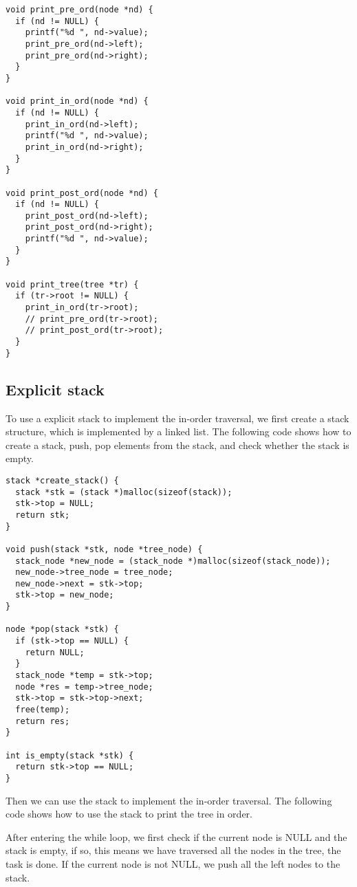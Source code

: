 \documentclass[a4paper,11pt]{article}
\begin{document}
\begin{verbatim}
void print_pre_ord(node *nd) {
  if (nd != NULL) {
    printf("%d ", nd->value);
    print_pre_ord(nd->left);
    print_pre_ord(nd->right);
  }
}

void print_in_ord(node *nd) {
  if (nd != NULL) {
    print_in_ord(nd->left);
    printf("%d ", nd->value);
    print_in_ord(nd->right);
  }
}

void print_post_ord(node *nd) {
  if (nd != NULL) {
    print_post_ord(nd->left);
    print_post_ord(nd->right);
    printf("%d ", nd->value);
  }
}

void print_tree(tree *tr) {
  if (tr->root != NULL) {
    print_in_ord(tr->root);
    // print_pre_ord(tr->root);
    // print_post_ord(tr->root);
  }
}
\end{verbatim}

\subsection*{Explicit stack}

To use a explicit stack to implement the in-order traversal, we first 
create a stack structure, which is implemented by a linked list. The following
code shows how to create a stack, push, pop elements from the stack, and check
whether the stack is empty.

\begin{verbatim}
stack *create_stack() {
  stack *stk = (stack *)malloc(sizeof(stack));
  stk->top = NULL;
  return stk;
}

void push(stack *stk, node *tree_node) {
  stack_node *new_node = (stack_node *)malloc(sizeof(stack_node));
  new_node->tree_node = tree_node;
  new_node->next = stk->top;
  stk->top = new_node;
}

node *pop(stack *stk) {
  if (stk->top == NULL) {
    return NULL;
  }
  stack_node *temp = stk->top;
  node *res = temp->tree_node;
  stk->top = stk->top->next;
  free(temp);
  return res;
}

int is_empty(stack *stk) {
  return stk->top == NULL;
}
\end{verbatim}

Then we can use the stack to implement the in-order traversal. The following
code shows how to use the stack to print the tree in order. 

After entering the 
while loop, we first check if the current node is NULL and the stack is empty,
if so, this means we have traversed all the nodes in the tree, the task is done.
If the current node is not NULL, we push all the left nodes to the stack. 
\end{document}
